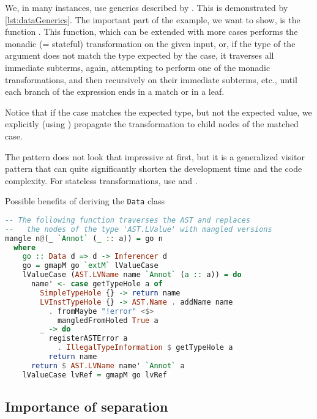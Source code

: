 We, in many instances, use generics described by \citet{lammel2003scrap}. This is demonstrated by \cref{lst:dataGenerics}. The important part of the example, we want to show, is the function . This function, which can be extended with more  cases performs the monadic (= stateful) transformation  on the given input, or, if the type of the argument does not match the type expected by the case, it traverses all immediate subterms, again, attempting to perform one of the monadic transformations, and then recursively on their immediate subterms, etc., until each branch of the expression ends in a match or in a leaf.

Notice that if the case matches the expected type, but not the expected value, we explicitly (using ) propagate the transformation to child nodes of the matched case.

The  pattern does not look that impressive at first, but it is a generalized visitor pattern that can quite significantly shorten the development time and the code complexity. For stateless transformations, use  and .

\begin{listing}
    \caption{Possible benefits of deriving the \texttt{Data} class}
    \label{lst:dataGenerics}
    \begin{lstlisting}[language=Haskell]
-- The following function traverses the AST and replaces
--   the nodes of the type 'AST.LValue' with mangled versions
mangle n@(_ `Annot` (_ :: a)) = go n
  where
    go :: Data d => d -> Inferencer d
    go = gmapM go `extM` lValueCase
    lValueCase (AST.LVName name `Annot` (a :: a)) = do
      name' <- case getTypeHole a of
        SimpleTypeHole {} -> return name
        LVInstTypeHole {} -> AST.Name . addName name
          . fromMaybe "!error" <$>
            mangledFromHoled True a
        _ -> do
          registerASTError a
            . IllegalTypeInformation $ getTypeHole a
          return name
      return $ AST.LVName name' `Annot` a
    lValueCase lvRef = gmapM go lvRef
    \end{lstlisting}

\end{listing}

\subsection{Importance of separation}

